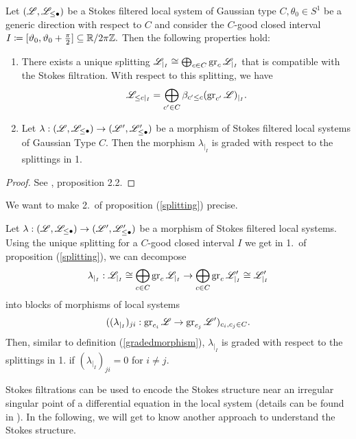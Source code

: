 \begin{prop}\label{splitting} Let $(\mathscr{L}, \mathscr{L}_{\leq \bullet})$ be a Stokes filtered local system of Gaussian type $C, \theta_0\in S^1$ be a generic direction with respect to $C$ and consider the $C$-good closed interval $I \coloneqq [\vartheta_0, \vartheta_0+\frac{\pi}{2}]\subseteq\mathbb{R}/2\pi \mathbb{Z}.$ Then the following properties hold:
\begin{enumerate} 
    \item There exists a unique splitting $\mathscr{L}_{\vert_I} \cong \bigoplus_{c \in C}\operatorname{gr}_c\mathscr{L}_{\vert_I}$ that is compatible with the Stokes filtration. With respect to this splitting, we have
    \[\mathscr{L}_{\leq c\vert_I} = \bigoplus_{c' \in C} \beta_{c' \leq c} (\operatorname{gr}_{c'} \mathscr{L})_{\vert_I}.\]
    \item Let $\lambda: (\mathscr{L}, \mathscr{L}_{\leq \bullet}) \to (\mathscr{L}', \mathscr{L}'_{\leq \bullet})$ be a morphism of Stokes filtered local systems of Gaussian Type $C$. Then the morphism $\lambda_{\vert_I}$ is graded with respect to the splittings in 1.
\end{enumerate}
\end{prop}

\begin{proof}
See \cite{Hertling-Sabbah_2011}, proposition 2.2.
\end{proof}

\begin{rem}
    We want to make 2.\ of proposition (\ref{splitting}) precise. 
    
    Let $\lambda:(\mathscr{L}, \mathscr{L}_{\leq \bullet}) \to (\mathscr{L}', \mathscr{L}'_{\leq \bullet})$ be a morphism of Stokes filtered local systems. Using the unique splitting for a $C$-good closed interval $I$ we get in 1.\ of proposition (\ref{splitting}), we can decompose
    \[ \lambda_{\vert_I}: \mathscr{L}_{\vert_I} \cong \bigoplus_{c \in C}\operatorname{gr}_c\mathscr{L}_{\vert_I} \to \bigoplus_{c \in C}\operatorname{gr}_c\mathscr{L}'_{\vert_I} \cong \mathscr{L}'_{\vert_I}\]
    into blocks of morphisms of local systems
    \[
    ((\lambda_{\vert_I})_{ji}: \operatorname{gr}_{c_i}\mathscr{L} \to \operatorname{gr}_{c_j}\mathscr{L}')_{c_i,c_j \in C}.
    \]
    Then, similar to definition (\ref{gradedmorphism}), $\lambda_{\vert_I}$ is graded with respect to the splittings in 1. if  $(\lambda_{\vert_I})_{ji} =0$ for $i \neq j$.
\end{rem}

Stokes filtrations can be used to encode the Stokes structure near an irregular singular point of a differential equation in the local system (details can be found in \cite{Sabbah_StokesStructures}). In the following, we will get to know another approach to understand the Stokes structure. 

